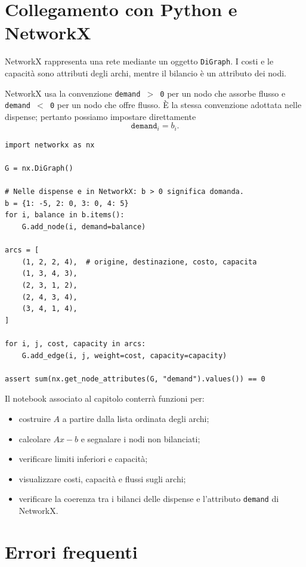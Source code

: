 \documentclass[11pt,a4paper]{article}
\begin{document}
\section{Collegamento con Python e NetworkX}

NetworkX rappresenta una rete mediante un oggetto \texttt{DiGraph}. I costi e le capacità sono attributi degli archi, mentre il bilancio è un attributo dei nodi.

\begin{networkxbox}
NetworkX usa la convenzione \texttt{demand $>$ 0} per un nodo che assorbe flusso e \texttt{demand $<$ 0} per un nodo che offre flusso. È la stessa convenzione adottata nelle dispense; pertanto possiamo impostare direttamente
\[
  \texttt{demand}_i=b_i.
\]
\end{networkxbox}

\begin{lstlisting}[style=python,caption={Costruzione della rete dell'esempio.}]
import networkx as nx

G = nx.DiGraph()

# Nelle dispense e in NetworkX: b > 0 significa domanda.
b = {1: -5, 2: 0, 3: 0, 4: 5}
for i, balance in b.items():
    G.add_node(i, demand=balance)

arcs = [
    (1, 2, 2, 4),  # origine, destinazione, costo, capacita
    (1, 3, 4, 3),
    (2, 3, 1, 2),
    (2, 4, 3, 4),
    (3, 4, 1, 4),
]

for i, j, cost, capacity in arcs:
    G.add_edge(i, j, weight=cost, capacity=capacity)

assert sum(nx.get_node_attributes(G, "demand").values()) == 0
\end{lstlisting}

Il notebook associato al capitolo conterrà funzioni per:
\begin{itemize}
  \item costruire $A$ a partire dalla lista ordinata degli archi;
  \item calcolare $Ax-b$ e segnalare i nodi non bilanciati;
  \item verificare limiti inferiori e capacità;
  \item visualizzare costi, capacità e flussi sugli archi;
  \item verificare la coerenza tra i bilanci delle dispense e l'attributo \texttt{demand} di NetworkX.
\end{itemize}

\section{Errori frequenti}
\end{document}
